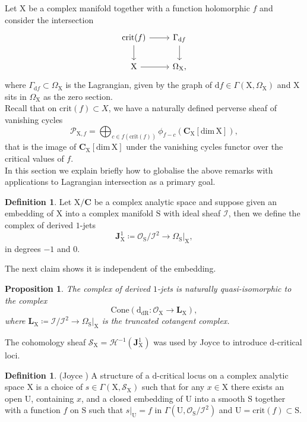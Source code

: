\documentclass{article}
\theoremstyle{plain}
\newtheorem{proposition}[theorem]{Proposition}
\theoremstyle{definition}
\newtheorem{definition}[theorem]{Definition}
\theoremstyle{remark}
\newcommand{\mr}{\mathrm}
\newcommand{\C}{\mathbf C}
\newcommand{\3}{\vspace{3mm}}
\newcommand{\2}{\vspace{2mm}}
\newcommand{\1}{\vspace{1mm}}
\begin{document}
Let $\mr{X}$ be a complex manifold together with a function holomorphic $f$ and consider the intersection
\[
\begin{tikzcd}
 \mr{crit}(f) \arrow[d] \arrow[r]& \Gamma_{\mr{d}f} \arrow[d]
 \\
\mr{X} \arrow[r]
  & \Omega_{\mr{X}},
\end{tikzcd}
\]
 where $\Gamma_{\mr{d}f} \subset \Omega_{\mr{X}}$ is the Lagrangian, given by the graph of $\mr{d}f \in \Gamma(\mr{X},\Omega_{\mr{X}})$ and $\mr{X}$ sits in $\Omega_{\mr{X}}$ as the zero section. \\
Recall that on $\mr{crit}(f) \subset X$, we have a naturally defined perverse sheaf of vanishing cycles 
\begin{equation}\label{canperv}
\mathscr{P}_{\mr{X},f}=\bigoplus_{c\in f(\mr{crit}(f))}\phi_{f-c}\left(\C_{\mr{X}}[\mr{dim}\,\mr{X}]\right),
\end{equation} that is the image of $\C_{\mr{X}}[\mr{dim}\,\mr{X}]$ under the vanishing cycles functor over the critical values of $f$.\\
In this section we explain briefly how to globalise the above remarks with applications to Lagrangian intersection as a primary goal.
\2
\begin{definition}
Let $\mr{X}/\C$ be a complex analytic space and suppose given an embedding of $\mr{X}$ into a complex manifold $\mr{S}$ with ideal sheaf $\mathscr{I}$, then we define the complex of derived $1$-jets $$\mathbf{J}^{1}_\mr{X} \coloneqq \mathscr{O}_{\mr{S}}/\mathscr{I}^{2} \to \Omega_{\mr{S}}|_{\mr{X}},$$ in degrees $-1$ and $0$.
\end{definition}
The next claim shows it is independent of the embedding.
\2
\begin{proposition}
 The complex of derived $1$-jets is naturally quasi-isomorphic to the complex $$\mr{Cone}\left(\mr{d}_\mr{dR}:\mathscr{O}_\mr{X} \to \mathbf{L}_\mr{X}\right),$$ where $\mathbf{L}_\mr{X} \coloneqq \mathscr{I}/\mathscr{I}^{2} \to \Omega_{\mr{S}}|_\mr{X}$ is the truncated cotangent complex.
\end{proposition} 
The cohomology sheaf $\mathscr{S}_{\mr{X}} = \mathscr{H}^{-1}(\mathbf{J}^{1}_\mr{X})$ was used by Joyce to introduce $\mr{d}$-critical loci.
\2
\begin{definition}(Joyce \cite{MR3399099})
 A structure of a $\mr{d}$-critical locus on a complex analytic space $\mr{X}$ is a choice of $s \in \Gamma(\mr{X},\mathscr{S}_\mr{X})$ such that for any $x \in \mr{X}$ there exists an open $\mr{U}$, containing $x$, and a closed embedding of $\mr{U}$ into a smooth $\mr{S}$ together with a function $f$ on $\mr{S}$ such that $s|_{\mr{U}} = f$ in $\Gamma(\mr{U},\mathscr{O}_{\mr{S}}/\mathscr{I}^{2})$ and $\mr{U} = \mr{crit}(f) \subset \mr{S}$. 
\end{definition}
\end{document}
